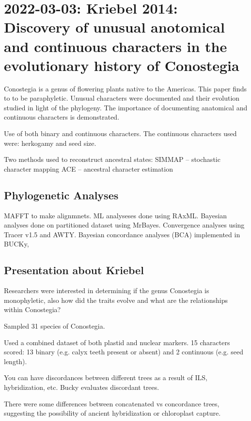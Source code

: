 \documentclass{article}
\begin{document}
\section{2022-03-03: Kriebel 2014: Discovery of unusual anotomical and
  continuous characters in the evolutionary history of Conostegia}

Conostegia is a genus of flowering plants native to the Americas. This paper
finds to to be paraphyletic. Unusual characters were documented and their
evolution studied in light of the phylogeny. The importance of documenting
anatomical and continuous characters is demonstrated.

Use of both binary and continuous characters. The continuous characters used were: herkogamy and seed size.

Two methods used to reconstruct ancestral states:
SIMMAP -- stochastic character mapping
ACE -- ancestral character estimation

\subsection{Phylogenetic Analyses}
MAFFT to make alignmnets. ML analyseses done using RAxML. Bayesian analyses done
on partitioned dataset using MrBayes. Convergence analyses using Tracer v1.5 and
AWTY. Bayesian concordance analyses (BCA) implemented in BUCKy,

\subsection{Presentation about Kriebel}

Researchers were interested in determining if the genus Conostegia is monophyletic, also how did the traits evolve and what are the relationships within Conostegia?

Sampled 31 species of Conostegia.

Used a combined dataset of both plastid and nuclear markers. 15 characters scored: 13 binary (e.g. calyx teeth present or absent) and 2 continuous (e.g. seed length). 

You can have discordances between different trees as a result of ILS, hybridization, etc. Bucky evaluates discordant trees.

There were some differences between concatenated vs concordance trees, suggesting the possibility of ancient hybridization or chloroplast capture.
\end{document}
